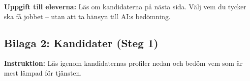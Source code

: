 \documentclass[12pt]{article}
\begin{document}
\begin{minipage}{\textwidth}
\vspace{10mm}
\textbf{Uppgift till eleverna:}
Läs om kandidaterna på nästa sida. Välj vem du tycker ska få jobbet – utan att ta hänsyn till AI:s bedömning.
\end{minipage}

\break

\subsection*{Bilaga 2: Kandidater (Steg 1)}

\begin{minipage}{\textwidth}
\textbf{Instruktion:} Läs igenom kandidaternas profiler nedan och bedöm vem som är mest lämpad för tjänsten.
\end{minipage}

\vspace{0.5em}
\end{document}
